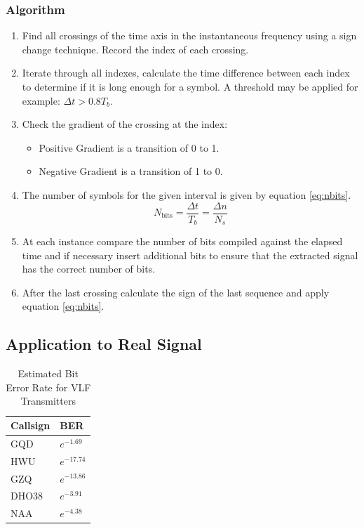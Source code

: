 \subsubsection{Algorithm}
\begin{enumerate}
    \item Find all crossings of the time axis in the instantaneous frequency using a sign change technique. Record the index of each crossing.
    \item Iterate through all indexes, calculate the time difference between each index to determine if it is long enough for a symbol. A threshold may be applied for example: $\Delta t > 0.8T_b$.
    \item Check the gradient of the crossing at the index:
    \begin{itemize}
        \item Positive Gradient is a transition of 0 to 1.
        \item Negative Gradient is a transition of 1 to 0.
    \end{itemize}
    \item The number of symbols for the given interval is given by equation \ref{eq:nbits}. 
    \begin{equation}
        N_{\text{bits}} = \frac{\Delta t}{T_b} = \frac{\Delta n}{N_s}
        \label{eq:nbits}
    \end{equation}
    \item At each instance compare the number of bits compiled against the elapsed time and if necessary insert additional bits to ensure that the extracted signal has the correct number of bits.
    \item After the last crossing calculate the sign of the last sequence and apply equation \ref{eq:nbits}.
\end{enumerate}


\subsection{Application to Real Signal}
\begin{table}[h!]
    \centering
    \begin{tabular}{l|l}
    Callsign & BER           \\
    \hline
    GQD      & $e^{-1.69}$  \\
    HWU      & $e^{-17.74}$ \\
    GZQ      & $e^{-13.86}$ \\
    DHO38    & $e^{-3.91}$  \\
    NAA      & $e^{-4.38}$ 
    \end{tabular}
    \caption{Estimated Bit Error Rate for VLF Transmitters}
    \label{tab:BER Real}
\end{table}

